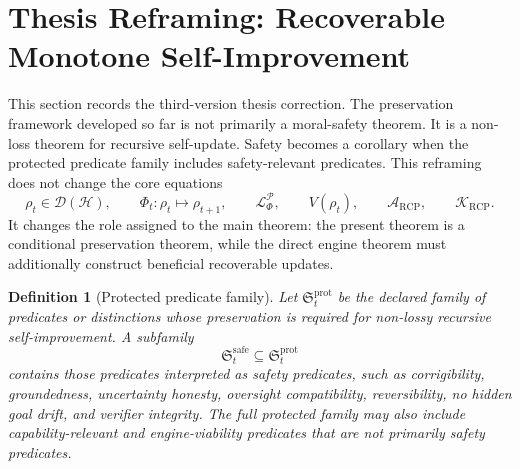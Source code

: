 \documentclass[11pt]{article}
\newtheorem{definition}[theorem]{Definition}
\newcommand{\D}{\mathcal{D}}
\newcommand{\Hcal}{\mathcal{H}}
\newcommand{\K}{\mathcal{K}}
\newcommand{\Acal}{\mathcal{A}}
\newcommand{\Pcal}{\mathcal{P}}
\newcommand{\Lcal}{\mathcal{L}}
\newcommand{\1}{\mathbf{1}}
\newcommand{\RCP}{\mathrm{RCP}}
\begin{document}
\section{Thesis Reframing: Recoverable Monotone Self-Improvement}
\label{sec:recoverable_monotone_reframing}

This section records the third-version thesis correction.  The preservation framework developed so far is not primarily a moral-safety theorem.  It is a non-loss theorem for recursive self-update.  Safety becomes a corollary when the protected predicate family includes safety-relevant predicates.  This reframing does not change the core equations
\[
\rho_t\in\D(\Hcal),\qquad
\Phi_t:\rho_t\mapsto\rho_{t+1},\qquad
\Lcal_{\Phi}^{\Pcal},\qquad
V(\rho_t),\qquad
\Acal_{\RCP},\qquad
\K_{\RCP}.
\]
It changes the role assigned to the main theorem: the present theorem is a conditional preservation theorem, while the direct engine theorem must additionally construct beneficial recoverable updates.

\begin{definition}[Protected predicate family]
Let \(\mathfrak S_t^{\mathrm{prot}}\) be the declared family of predicates or distinctions whose preservation is required for non-lossy recursive self-improvement.  A subfamily
\[
\mathfrak S_t^{\mathrm{safe}}\subseteq \mathfrak S_t^{\mathrm{prot}}
\]
contains those predicates interpreted as safety predicates, such as corrigibility, groundedness, uncertainty honesty, oversight compatibility, reversibility, no hidden goal drift, and verifier integrity.  The full protected family may also include capability-relevant and engine-viability predicates that are not primarily safety predicates.
\end{definition}
\end{document}
